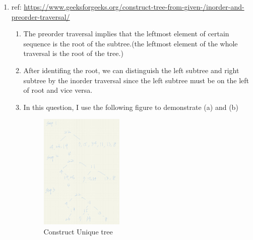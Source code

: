\documentclass{article}
\begin{document}
\begin{CJK*}{UTF8}{bsmi}
\begin{enumerate}
    \item ref: \url{https://www.geeksforgeeks.org/construct-tree-from-given-/inorder-and-preorder-traversal/} 
    \begin{enumerate}
        \item The preorder traversal implies that the leftmost element of certain sequence is the root of the subtree.(the leftmost element of the whole traversal is the root of the tree.)
        \item After identifing the root, we can distinguish the left subtree and right subtree by the inorder traversal since the left subtree must be on the left of root and vice versa.
        \item In this question, I use the following figure to demonstrate (a) and (b)
        \begin{figure}[h]
            \centering
            \includegraphics[width=0.4\textwidth]{IMG_0255.jpg}
            \caption{Construct Unique tree}
            \label{fig:my_label}
        \end{figure}
    \end{enumerate}
    
    
    


\end{enumerate}
\end{CJK*}
\end{document}
